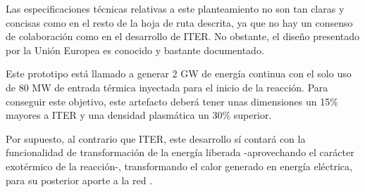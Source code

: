 Las especificaciones técnicas relativas a este planteamiento no son tan claras y concisas como en el resto de la hoja de ruta descrita, ya que no hay un consenso de colaboración como en el desarrollo de ITER. No obstante, el diseño presentado por la Unión Europea es conocido y bastante documentado.

Este prototipo está llamado a generar 2 GW de energía continua con el solo uso de 80 MW de entrada térmica inyectada para el inicio de la reacción.  Para conseguir este objetivo, este artefacto deberá tener unas dimensiones un 15\% mayores a ITER y una densidad plasmática un 30\% superior.

Por supuesto, al contrario que ITER, este desarrollo sí contará con la funcionalidad de transformación de la energía liberada -aprovechando el carácter exotérmico de la reacción-, transformando el calor generado en energía eléctrica, para su posterior aporte a la red \cite{49}.
